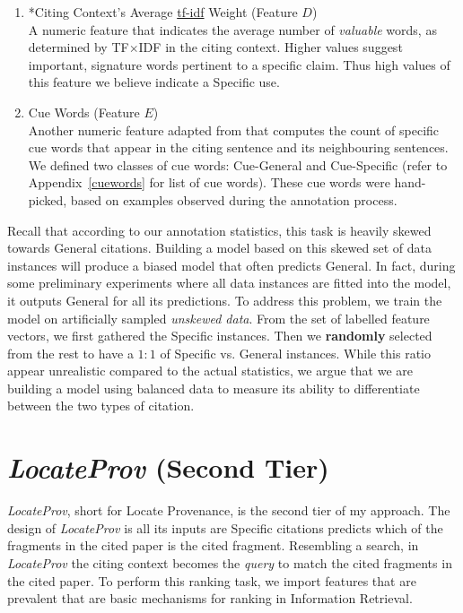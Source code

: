 \begin{enumerate}
\item *Citing Context's Average \url{tf-idf} Weight (Feature $D$)\\
A numeric feature that indicates the average number of \textit{valuable} words, as determined by TF$\times$IDF \cite{irtextbook} in the citing context. Higher values suggest important, signature words pertinent to a specific claim.  Thus high values of this feature we believe indicate a Specific use.

\item Cue Words (Feature $E$)\\
Another numeric feature adapted from  that computes the count of specific cue words that appear in the citing sentence and its neighbouring sentences. We defined two classes of cue words: Cue-General and Cue-Specific (refer to Appendix~\ref{cuewords} for list of cue words). These cue words were hand-picked, based on examples observed during the annotation process.
\end{enumerate}

Recall that according to our annotation statistics, this task is heavily skewed towards General citations. Building a model based on this skewed set of data instances will produce a biased model that often predicts General. In fact, during some preliminary experiments where all data instances are fitted into the model, it outputs General for all its predictions. To address this problem, we train the model on artificially sampled {\it unskewed data}.  From the set of labelled feature vectors, we first gathered the Specific instances. Then we {\bf randomly} selected from the rest to have a $1:1$ of Specific vs. General instances. While this ratio appear unrealistic compared to the actual statistics, we argue that we are building a model using balanced data to measure its ability to differentiate between the two types of citation.

\section{{\it LocateProv} (Second Tier)}
\label{secondtier}
{\it LocateProv}, short for Locate Provenance, is the second tier of my approach. The design of {\it LocateProv} is all its inputs are Specific citations predicts which of the fragments in the cited paper is the cited fragment. Resembling a search, in {\it LocateProv} the citing context becomes the {\it query} to match the cited fragments in the cited paper. To perform this ranking task, we import features that are prevalent that are basic mechanisms for ranking in Information Retrieval.

